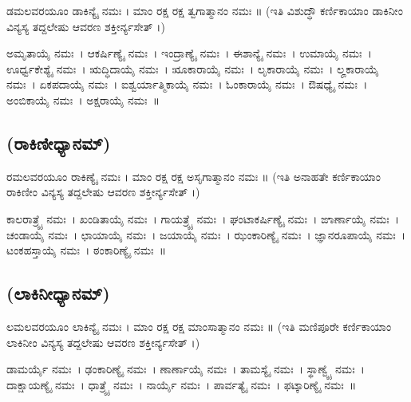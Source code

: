  ಡಮಲವರಯೂಂ ಡಾಕಿನ್ಯೈ ನಮಃ ।  ಮಾಂ ರಕ್ಷ ರಕ್ಷ ತ್ವಗಾತ್ಮಾನಂ ನಮಃ ॥ (ಇತಿ ವಿಶುದ್ಧೌ ಕರ್ಣಿಕಾಯಾಂ ಡಾಕಿನೀಂ ವಿನ್ಯಸ್ಯ ತದ್ದಲೇಷು ಆವರಣ ಶಕ್ತೀರ್ನ್ಯಸೇತ್ ।)

 ಅಮೃತಾಯೈ ನಮಃ~।  ಆಕರ್ಷಿಣ್ಯೈ ನಮಃ~।  ಇಂದ್ರಾಣ್ಯೈ ನಮಃ~।  ಈಶಾನ್ಯೈ ನಮಃ~।  ಉಮಾಯೈ ನಮಃ~।  ಊರ್ಧ್ವಕೇಶ್ಯೈ ನಮಃ~।  ಋದ್ಧಿದಾಯೈ ನಮಃ~।  ೠಕಾರಾಯೈ ನಮಃ~।  ಲೃಕಾರಾಯೈ ನಮಃ~।  ಲೄಕಾರಾಯೈ ನಮಃ~।  ಏಕಪದಾಯೈ ನಮಃ~।  ಐಶ್ವರ್ಯಾತ್ಮಿಕಾಯೈ ನಮಃ~।  ಓಂಕಾರಾಯೈ ನಮಃ~।  ಔಷಧ್ಯೈ ನಮಃ~।  ಅಂಬಿಕಾಯೈ ನಮಃ~।  ಅಕ್ಷರಾಯೈ ನಮಃ~॥
\subsection{(ರಾಕಿಣೀಧ್ಯಾನಮ್)}

 ರಮಲವರಯೂಂ ರಾಕಿಣ್ಯೈ ನಮಃ ।  ಮಾಂ ರಕ್ಷ ರಕ್ಷ ಅಸೃಗಾತ್ಮಾನಂ ನಮಃ ॥ (ಇತಿ ಅನಾಹತೇ ಕರ್ಣಿಕಾಯಾಂ ರಾಕಿಣೀಂ ವಿನ್ಯಸ್ಯ ತದ್ದಲೇಷು ಆವರಣ ಶಕ್ತೀರ್ನ್ಯಸೇತ್ ।)

  ಕಾಲರಾತ್ರ್ಯೈ ನಮಃ~।  ಖಂಡಿತಾಯೈ ನಮಃ~।  ಗಾಯತ್ರ್ಯೈ ನಮಃ~।  ಘಂಟಾಕರ್ಷಿಣ್ಯೈ ನಮಃ~।  ಙಾರ್ಣಾಯೈ ನಮಃ~।  ಚಂಡಾಯೈ ನಮಃ~।  ಛಾಯಾಯೈ ನಮಃ~।  ಜಯಾಯೈ ನಮಃ~।  ಝಂಕಾರಿಣ್ಯೈ ನಮಃ~।  ಜ್ಞಾನರೂಪಾಯೈ ನಮಃ~।  ಟಂಕಹಸ್ತಾಯೈ ನಮಃ~।  ಠಂಕಾರಿಣ್ಯೈ ನಮಃ~॥
\subsection{(ಲಾಕಿನೀಧ್ಯಾನಮ್)}

 ಲಮಲವರಯೂಂ ಲಾಕಿನ್ಯೈ ನಮಃ ।  ಮಾಂ ರಕ್ಷ ರಕ್ಷ ಮಾಂಸಾತ್ಮಾನಂ ನಮಃ ॥ (ಇತಿ ಮಣಿಪೂರೇ ಕರ್ಣಿಕಾಯಾಂ ಲಾಕಿನೀಂ ವಿನ್ಯಸ್ಯ ತದ್ದಲೇಷು ಆವರಣ ಶಕ್ತೀರ್ನ್ಯಸೇತ್ ।)

 ಡಾಮರ್ಯೈ ನಮಃ~।  ಢಂಕಾರಿಣ್ಯೈ ನಮಃ~।  ಣಾರ್ಣಾಯೈ ನಮಃ~।  ತಾಮಸ್ಯೈ ನಮಃ~।  ಸ್ಥಾಣ್ವ್ಯೈ ನಮಃ~।  ದಾಕ್ಷಾಯಣ್ಯೈ ನಮಃ~।  ಧಾತ್ರ್ಯೈ ನಮಃ~।  ನಾರ್ಯೈ ನಮಃ~।  ಪಾರ್ವತ್ಯೈ ನಮಃ~।  ಫಟ್ಕಾರಿಣ್ಯೈ ನಮಃ~॥
